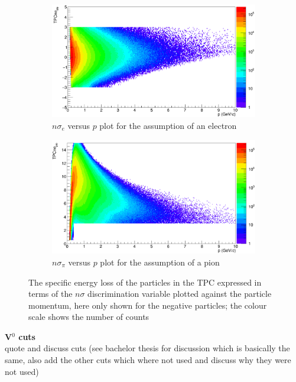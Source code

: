 \begin{figure}
\begin{subfigure}[t]{0.5\linewidth}
\centering
\includegraphics[width=0.98\linewidth]{Figures/V0cuts/tpcnsigmaeleneg.png}
\caption{$n\sigma_e$ versus $p$ plot for the assumption of an electron}
\label{fig:V0tpcele}
\end{subfigure} \hspace{0.1cm}
\begin{subfigure}[t]{.5\linewidth}
\centering
\includegraphics[width=0.98\linewidth]{Figures/V0cuts/tpcnsigmapioneg.png}
\caption{$n\sigma_{\pi}$ versus $p$ plot for the assumption of a pion}
\label{fig:V0tpcpio}
\end{subfigure}
\caption{The specific energy loss of the particles in the TPC expressed in terms of the $n\sigma$ discrimination variable plotted against the particle momentum, here only shown for the negative particles; the colour scale shows the number of counts}
\label{fig:V0tpc}
\end{figure}

\textbf{V$^0$ cuts} \\


quote and discuss cuts (see bachelor thesis for discussion which is basically the same, also add the other cuts which where not used and discuss why they were not used) \\  


